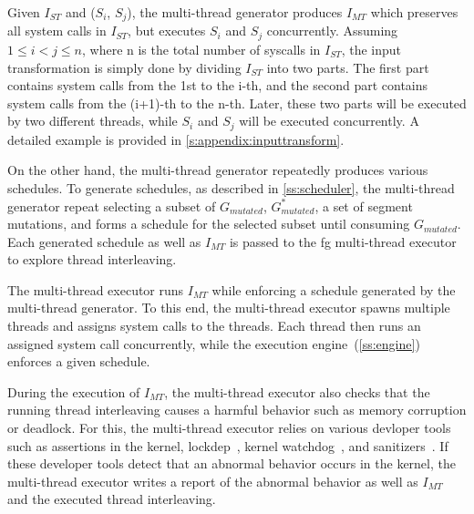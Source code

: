 %   
Given $I_{ST}$ and ($S_i$, $S_j$), the multi-thread generator produces
$I_{MT}$ which preserves all system calls in $I_{ST}$, but executes
$S_i$ and $S_j$ concurrently.
%
Assuming $1 \le i < j \le n$, where n is the total number of syscalls
in $I_{ST}$, the input transformation is simply done by dividing
$I_{ST}$ into two parts.
%
The first part contains system calls from the 1st to the i-th, and the
second part contains system calls from the (i+1)-th to the n-th.
%
Later, these two parts will be executed by two different threads,
while $S_i$ and $S_j$ will be executed concurrently. A detailed
example is provided in \autoref{s:appendix:inputtransform}.



On the other hand, the multi-thread generator repeatedly produces
various schedules.
%
To generate schedules, as described in \autoref{ss:scheduler}, the
multi-thread generator repeat selecting a subset of $G_{mutated}$,
$G^{*}_{mutated}$, a set of segment mutations, and forms a schedule
for the selected subset until consuming $G_{mutated}$.
%
Each generated schedule as well as $I_{MT}$ is passed to the
fg
multi-thread executor to explore thread interleaving.






%
The multi-thread executor runs $I_{MT}$ while enforcing a schedule
generated by the multi-thread generator.
%
To this end, the multi-thread executor spawns multiple threads and
assigns system calls to the threads.
%
Each thread then runs an assigned system call concurrently, while
the execution engine~(\autoref{ss:engine}) enforces a given schedule.


During the execution of $I_{MT}$, the multi-thread executor also
checks that the running thread interleaving causes a harmful behavior
such as memory corruption or deadlock.
%
For this, the multi-thread executor relies on various devloper tools
such as assertions in the kernel, lockdep~\cite{lockdep}, kernel
watchdog~\cite{watchdog}, and sanitizers~\cite{kasan, ubsan, asan}.
%
If these developer tools detect that an abnormal behavior occurs in
the kernel, the multi-thread executor writes a report of the abnormal
behavior as well as $I_{MT}$ and the executed thread interleaving.







